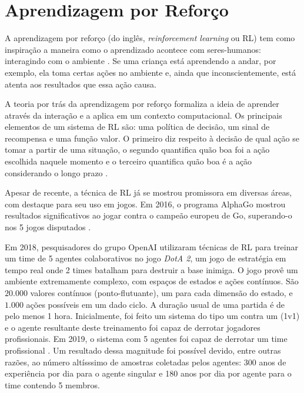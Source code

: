 \section{Aprendizagem por Reforço}
\par A aprendizagem por reforço (do inglês, \textit{reinforcement learning} ou RL) tem como inspiração a maneira como o aprendizado acontece com seres-humanos: interagindo com o ambiente \cite{sutton2018reinforcement}. Se uma criança está aprendendo a andar, por exemplo, ela toma certas ações no ambiente e, ainda que inconscientemente, está atenta aos resultados que essa ação causa. 
\par A teoria por trás da aprendizagem por reforço formaliza a ideia de aprender através da interação e a aplica em um contexto computacional. Os principais elementos de um sistema de RL são: uma política de decisão, um sinal de recompensa e uma função valor.  O primeiro diz respeito à decisão de qual ação se tomar a partir de uma situação, o segundo quantifica quão boa foi a ação escolhida naquele momento e o terceiro quantifica quão boa é a ação considerando o longo prazo \cite{sutton2018reinforcement}.
\par Apesar de recente, a técnica de RL já se mostrou promissora em diversas áreas, com destaque para seu uso em jogos. Em 2016, o programa AlphaGo mostrou resultados significativos ao jogar contra o campeão europeu de Go, superando-o nos 5 jogos disputados \cite{SilverHuangEtAl16nature}.

Em 2018, pesquisadores do grupo OpenAI utilizaram técnicas de RL para treinar um time de 5 agentes colaborativos no jogo \textit{DotA 2}, um jogo de estratégia em tempo real onde 2 times batalham para destruir a base inimiga. O jogo provê um ambiente extremamente complexo, com espaços de estados e ações contínuos. São $20.000$ valores contínuos (ponto-flutuante), um para cada dimensão do estado, e $1.000$ ações possíveis em um dado ciclo.
A duração usual de uma partida é de pelo menos 1 hora. Inicialmente, foi feito um sistema do tipo um contra um (1v1) e o agente resultante deste treinamento foi capaz de derrotar jogadores profissionais. Em 2019, o sistema com 5 agentes foi capaz de derrotar um time profissional \cite{OpenAI_dota}. Um resultado dessa magnitude foi possível devido, entre outras razões, ao número altísssimo de amostras coletadas pelos agentes: 300 anos de experiência por dia para o agente singular e 180 anos por dia por agente para o time contendo 5 membros.

